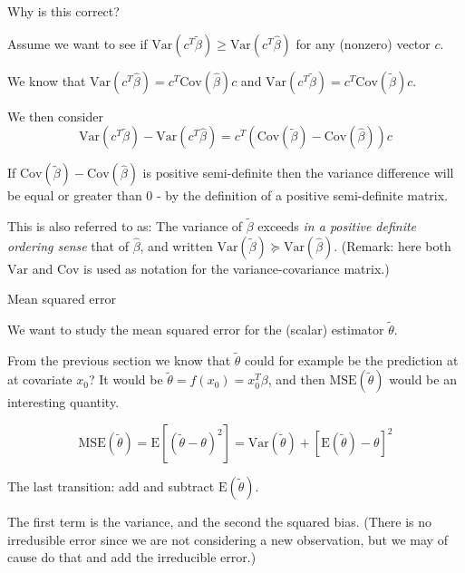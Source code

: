 \documentclass[
  ignorenonframetext,
]{beamer}
\begin{document}
\begin{frame}

\begin{block}{Why is this correct?}

Assume we want to see if
\(\text{Var}(c^T\tilde{\beta})\ge \text{Var}(c^T\hat{\beta})\) for any
(nonzero) vector \(c\).

We know that \(\text{Var}(c^T\hat{\beta})=c^T \text{Cov}(\hat{\beta})c\)
and \(\text{Var}(c^T\tilde{\beta})=c^T \text{Cov}(\tilde{\beta})c\).

We then consider
\[\text{Var}(c^T\tilde{\beta})- \text{Var}(c^T\hat{\beta})=c^T(\text{Cov}(\tilde{\beta})-\text{Cov}(\hat{\beta}))c\]

\end{block}

\end{frame}

\begin{frame}

If \(\text{Cov}(\tilde{\beta})-\text{Cov}(\hat{\beta})\) is positive
semi-definite then the variance difference will be equal or greater than
0 - by the definition of a positive semi-definite matrix.

This is also referred to as: The variance of \(\tilde{\beta}\) exceeds
\emph{in a positive definite ordering sense} that of \(\hat{\beta}\),
and written
\(\text{Var}(\tilde{\beta}) \succeq \text{Var}(\hat{\beta})\). (Remark:
here both \(\text{Var}\) and \(\text{Cov}\) is used as notation for the
variance-covariance matrix.)

\end{frame}

\begin{frame}

\begin{block}{Mean squared error}

We want to study the mean squared error for the (scalar) estimator
\(\tilde{\theta}\).

From the previous section we know that \(\tilde{\theta}\) could for
example be the prediction at at covariate \(x_0\)? It would be
\(\tilde{\theta}=f(x_0)=x_0^T \beta\), and then
\(\text{MSE}(\tilde{\theta})\) would be an interesting quantity.

\[\text{MSE}(\tilde{\theta})= \text{E}[(\tilde{\theta}-\theta)^2]=\text{Var}(\tilde{\theta})+[\text{E}(\tilde{\theta})-\theta]^2\]

The last transition: add and subtract \(\text{E}(\tilde{\theta})\).

The first term is the variance, and the second the squared bias. (There
is no irredusible error since we are not considering a new observation,
but we may of cause do that and add the irreducible error.)

\end{block}

\end{frame}
\end{document}
